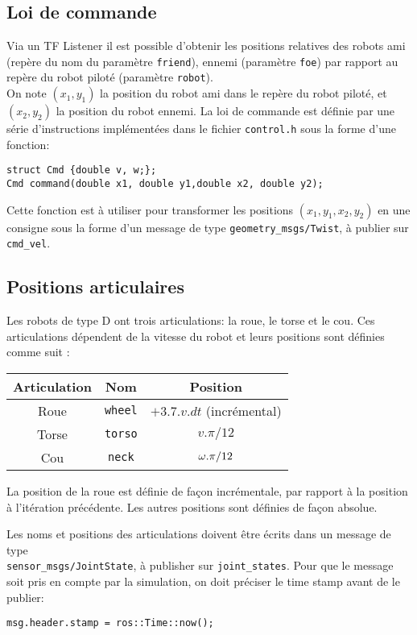 \documentclass{ecnreport}
\begin{document}
\subsection{Loi de commande}

Via un TF Listener il est possible d'obtenir les positions relatives des robots ami (repère du nom du paramètre \texttt{friend}), ennemi (paramètre \texttt{foe}) par rapport au repère du robot piloté (paramètre \texttt{robot}).\\

On note $(x_1, y_1)$ la position du robot ami dans le repère du robot piloté, et $(x_2,y_2)$ la position du robot ennemi. 
La loi de commande est définie par une série d'instructions implémentées dans le fichier \texttt{control.h} sous la forme d'une fonction:
 \begin{center}\cppstyle
\begin{lstlisting}
struct Cmd {double v, w;};
Cmd command(double x1, double y1,double x2, double y2);
\end{lstlisting}
\end{center}
Cette fonction est à utiliser pour transformer les positions $(x_1,y_1,x_2,y_2)$ en une consigne sous la forme d'un message de type \texttt{geometry\_msgs/Twist}, à publier sur \texttt{cmd\_vel}.

\subsection{Positions articulaires}

Les robots de type D ont trois articulations: la roue, le torse et le cou. Ces articulations dépendent de la vitesse du robot et leurs positions sont définies comme suit :
\begin{center}
 \begin{tabular}{|c|c|c|}\hline
  Articulation & Nom & Position \\\hline
  Roue & \texttt{wheel} & $+3.7.v.dt$ (incrémental) \\\hline
  Torse & \texttt{torso} & $v.\pi/12$\\\hline
  Cou & \texttt{neck} & $\omega.\pi/12$\\\hline
 \end{tabular}
\end{center}
La position de la roue est définie de façon incrémentale, par rapport à la position à l'itération précédente. Les autres positions sont définies de façon absolue.

Les noms et positions des articulations doivent être écrits dans un message de type\\ \texttt{sensor\_msgs/JointState}, à publisher sur \texttt{joint\_states}. Pour que le message soit pris en compte par la simulation, on doit préciser le time stamp avant de le publier:
 \begin{center}\cppstyle
\begin{lstlisting}
msg.header.stamp = ros::Time::now();
\end{lstlisting}
\end{center}
\end{document}
